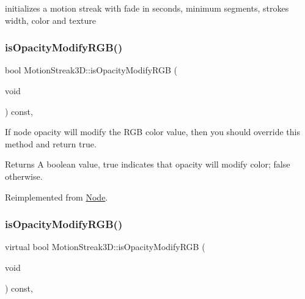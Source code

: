 initializes a motion streak with fade in seconds, minimum segments, stroke\textquotesingle{}s width, color and texture \mbox{\label{classMotionStreak3D_a6b513fcdb7b462e2a28bb67e3dd35836}} 
\subsubsection{\texorpdfstring{is\+Opacity\+Modify\+R\+G\+B()}{isOpacityModifyRGB()}\hspace{0.1cm}{\footnotesize\ttfamily [1/2]}}
{\footnotesize\ttfamily bool Motion\+Streak3\+D\+::is\+Opacity\+Modify\+R\+GB (\begin{DoxyParamCaption}\item[{void}]{ }\end{DoxyParamCaption}) const\hspace{0.3cm}{\ttfamily [override]}, {\ttfamily [virtual]}}

If node opacity will modify the R\+GB color value, then you should override this method and return true. \begin{DoxyReturn}{Returns}
A boolean value, true indicates that opacity will modify color; false otherwise. 
\end{DoxyReturn}


Reimplemented from \hyperlink{classNode_ae6ce32d2088e2bb3426608334f1091c5}{Node}.

\mbox{\label{classMotionStreak3D_a5de4e2e686f06acfecf86fc7b7caed6e}} 
\subsubsection{\texorpdfstring{is\+Opacity\+Modify\+R\+G\+B()}{isOpacityModifyRGB()}\hspace{0.1cm}{\footnotesize\ttfamily [2/2]}}
{\footnotesize\ttfamily virtual bool Motion\+Streak3\+D\+::is\+Opacity\+Modify\+R\+GB (\begin{DoxyParamCaption}\item[{void}]{ }\end{DoxyParamCaption}) const\hspace{0.3cm}{\ttfamily [override]}, {\ttfamily [virtual]}}

